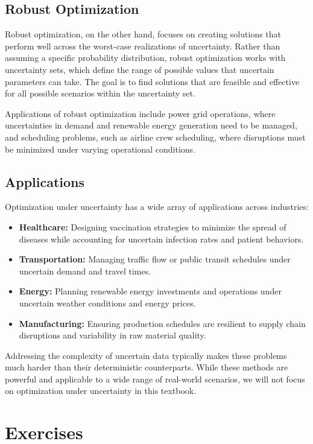 \subsection{Robust Optimization}

Robust optimization, on the other hand, focuses on creating solutions that perform well across the worst-case realizations of uncertainty. Rather than assuming a specific probability distribution, robust optimization works with uncertainty sets, which define the range of possible values that uncertain parameters can take. The goal is to find solutions that are feasible and effective for all possible scenarios within the uncertainty set.

Applications of robust optimization include power grid operations, where uncertainties in demand and renewable energy generation need to be managed, and scheduling problems, such as airline crew scheduling, where disruptions must be minimized under varying operational conditions.

\subsection{Applications}

Optimization under uncertainty has a wide array of applications across industries:
\begin{itemize}
    \item \textbf{Healthcare:} Designing vaccination strategies to minimize the spread of diseases while accounting for uncertain infection rates and patient behaviors.
    \item \textbf{Transportation:} Managing traffic flow or public transit schedules under uncertain demand and travel times.
    \item \textbf{Energy:} Planning renewable energy investments and operations under uncertain weather conditions and energy prices.
    \item \textbf{Manufacturing:} Ensuring production schedules are resilient to supply chain disruptions and variability in raw material quality.
\end{itemize}

Addressing the complexity of uncertain data typically makes these problems much harder than their deterministic counterparts. While these methods are powerful and applicable to a wide range of real-world scenarios, we will not focus on optimization under uncertainty in this textbook.

\section{Exercises}

